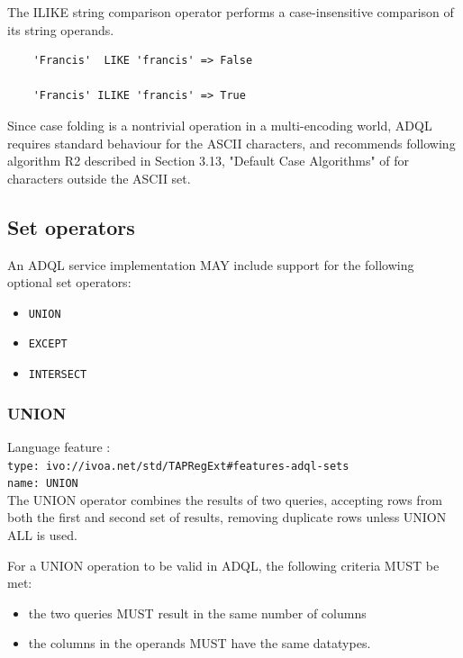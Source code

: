 \documentclass[11pt,a4paper]{ivoa}
\begin{document}
The ILIKE string comparison operator performs a case-insensitive comparison
of its string operands.

\begin{verbatim}
    'Francis'  LIKE 'francis' => False

    'Francis' ILIKE 'francis' => True
\end{verbatim}

Since case folding is a nontrivial operation in a multi-encoding world,
ADQL requires standard behaviour for the ASCII characters, and recommends
following algorithm R2 described in Section 3.13, "Default Case Algorithms"
of \citet{std:UNICODE} for characters outside the ASCII set.

\subsection{Set operators}
\label{sec:set.operators}

An ADQL service implementation MAY include support for the following optional
set operators:

\begin{itemize}
    \item \verb:UNION:
    \item \verb:EXCEPT:
    \item \verb:INTERSECT:
\end{itemize}

\subsubsection{UNION}
{\footnotesize Language feature :}\\
{\footnotesize \verb|type: ivo://ivoa.net/std/TAPRegExt#features-adql-sets|}\\
{\footnotesize \verb|name: UNION|}\\

The UNION operator combines the results of two queries, accepting rows from
both the first and second set of results,
removing duplicate rows unless UNION ALL is used.

For a UNION operation to be valid in ADQL, the following criteria MUST be met:
\begin{itemize}
    \item the two queries MUST result in the same number of columns
    \item the columns in the operands MUST have the same datatypes.
\end{itemize}
\end{document}
